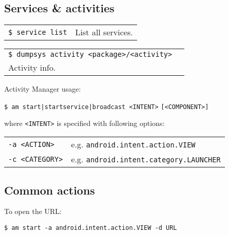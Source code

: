 \documentclass[11pt,landscape,a4paper]{article}
\begin{document}
\begin{multicols}{3}
{\subsection{Services \& activities}
\begin{tabular}{@{}ll@{}}
\texttt{\$ service list} & \hspace*{2.3cm}List all services.\\
\end{tabular}
\begin{tabular}{@{}ll@{}}
\texttt{\$ dumpsys activity <package>/<activity>} & \\
\hspace*{5cm} Activity info. & \\
\end{tabular}
}

\vspace*{2mm}
\parbox{0.30\textwidth}{
Activity Manager usage: 

\vspace*{1mm}

\texttt{\$ am start|startservice|broadcast <INTENT>}
\hspace*{6cm}\texttt{[<COMPONENT>]}

\vspace*{1mm}

where \texttt{<INTENT>} is specified with following options:

\vspace*{1mm}

\begin{tabular}{@{}ll@{}}
\texttt{-a <ACTION>} & e.g. \texttt{android.intent.action.VIEW}\\
\texttt{-c <CATEGORY>} & e.g. \texttt{android.intent.category.LAUNCHER}\\
\end{tabular}}

\vspace*{2mm}

\columnbreak
\subsection{Common actions}
\parbox{0.30\textwidth}{
To open the URL:

\vspace*{1mm}

\texttt{\$ am start -a android.intent.action.VIEW -d URL}

}
\end{multicols}
\end{document}
